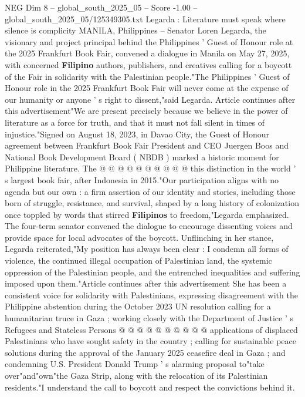 \begin{textsample}{NEG Dim 8 – global\_south\_2025\_05 – Score -1.00 – global\_south\_2025\_05/125349305.txt}  \label{ex:f8_neg_308}
Legarda : Literature must speak where silence is complicity MANILA, Philippines -- Senator Loren Legarda, the visionary and project principal behind the Philippines ' Guest of Honour role at the 2025 Frankfurt Book Fair, convened a dialogue in Manila on May 27, 2025, with concerned \textbf{Filipino} authors, publishers, and creatives calling for a boycott of the Fair in solidarity with the Palestinian people."The Philippines ' Guest of Honour role in the 2025 Frankfurt Book Fair will never come at the expense of our humanity or anyone ' s right to dissent,"said Legarda.
Article continues after this advertisement"We are present precisely because we believe in the power of literature as a force for truth, and that it must not fall silent in times of injustice."Signed on August 18, 2023, in Davao City, the Guest of Honour agreement between Frankfurt Book Fair President and CEO Juergen Boos and National Book Development Board ( NBDB ) marked a historic moment for Philippine literature.
The @ @ @ @ @ @ @ @ @ @ this distinction in the world ' s largest book fair, after Indonesia in 2015."Our participation aligns with no agenda but our own : a firm assertion of our identity and stories, including those born of struggle, resistance, and survival, shaped by a long history of colonization once toppled by words that stirred \textbf{Filipinos} to freedom,"Legarda emphasized.
The four-term senator convened the dialogue to encourage dissenting voices and provide space for local advocates of the boycott.
Unflinching in her stance, Legarda reiterated,"My position has always been clear : I condemn all forms of violence, the continued illegal occupation of Palestinian land, the systemic oppression of the Palestinian people, and the entrenched inequalities and suffering imposed upon them."Article continues after this advertisement She has been a consistent voice for solidarity with Palestinians, expressing disagreement with the Philippine abstention during the October 2023 UN resolution calling for a humanitarian truce in Gaza ; working closely with the Department of Justice ' s Refugees and Stateless Persons @ @ @ @ @ @ @ @ @ @ applications of displaced Palestinians who have sought safety in the country ; calling for sustainable peace solutions during the approval of the January 2025 ceasefire deal in Gaza ; and condemning U.S.
President Donald Trump ' s alarming proposal to"take over"and"own"the Gaza Strip, along with the relocation of its Palestinian residents."I understand the call to boycott and respect the convictions behind it.

\end{textsample}
